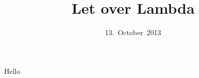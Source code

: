 

\title{Let over Lambda}
\date{13.~October~2013}



\frame{\titlepage}

\begin{frame}
  Hello
\end{frame}


